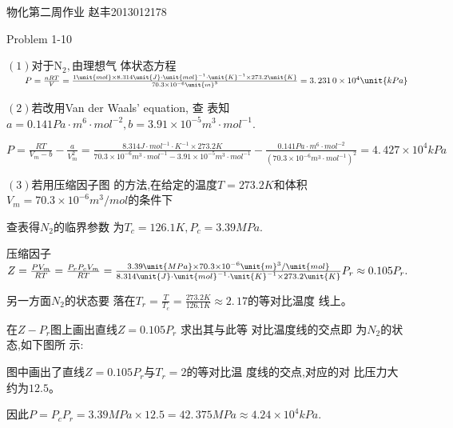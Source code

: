 \documentclass{ctexart}
\begin{document}
\bigskip 物化第二周作业\qquad
\qquad \qquad 赵丰2013012178

Problem 1-10

$\left( 1\right) $对于N$_{2},$由理想气%
体状态方程$\qquad P=\frac{nRT}{V}=\frac{1\unit{%
mol}\times 8.314\unit{J}\cdot \unit{mol}^{-1}\cdot \unit{K}^{-1}\times 273.2%
\unit{K}}{70.3\times 10^{-6}\unit{m}^{3}}=\allowbreak 3.\,\allowbreak
231\,0\times 10^{4}\unit{kPa}$

$\left( 2\right) $若改用Van der Waals' equation, 查%
表知\qquad $a=0.141\unit{Pa}\cdot \unit{m}^{6}\cdot \unit{mol}%
^{-2},b=3.91\times 10^{-5}\unit{m}^{3}\cdot \unit{mol}^{-1}.$

$P=\frac{RT}{V_{m}-b}-\frac{a}{V_{m}^{2}}=\frac{8.314\unit{J}\cdot \unit{mol}%
^{-1}\cdot \unit{K}^{-1}\times 273.2\unit{K}}{70.3\times 10^{-6}\unit{m}%
^{3}\cdot \unit{mol}^{-1}-3.91\times 10^{-5}\unit{m}^{3}\cdot \unit{mol}^{-1}%
}-\frac{0.141\unit{Pa}\cdot \unit{m}^{6}\cdot \unit{mol}^{-2}}{\left(
70.3\times 10^{-6}\unit{m}^{3}\cdot \unit{mol}^{-1}\right) ^{2}}=\allowbreak
4.\,\allowbreak 427\times 10^{4}\unit{kPa}$

$\left( 3\right) $若用压缩因子图%
的方法,在给定的温度$%
T=273.2\unit{K}$和体积$V_{m}=70.3\times 10^{-6}\unit{m}%
^{3}/\unit{mol}$的条件下

查表得$N_{2}$的临界参数%
为$T_{c}=126.1\unit{K},P_{c}=3.39\unit{MPa}.$

压缩因子$Z=\frac{PV_{m}}{RT}=\frac{P_{r}P_{c}V_{m}}{%
RT}=\frac{3.39\unit{MPa}\times 70.3\times 10^{-6}\unit{m}^{3}/\unit{mol}}{%
8.314\unit{J}\cdot \unit{mol}^{-1}\cdot \unit{K}^{-1}\times 273.2\unit{K}}%
P_{r}\approx \allowbreak 0.105P_{r}.$

另一方面$N_{2}$的状态要%
落在$T_{r}=\frac{T}{T_{c}}=\frac{273.2\unit{K}}{126.1\unit{K}}%
\approx 2.\,\allowbreak 17$的等对比温度%
线上$。 $

在$Z-P_{r}$图上画出直线$%
\allowbreak Z=0.105P_{r}$ 求出其与此等%
对比温度线的交点即%
为$N_{2}$的状态,如下图所%
示$:$


图中画出了直线$\allowbreak
Z=0.105P_{r}$与$T_{r}=2$的等对比温%
度线的交点,对应的对%
比压力大约为$12.5。 $

因此$P=P_{c}P_{r}=3.39\unit{MPa}\times 12.5=\allowbreak
42.\,\allowbreak 375\unit{MPa}\approx 4.24\times 10^{4}\unit{kPa}.$
\end{document}
